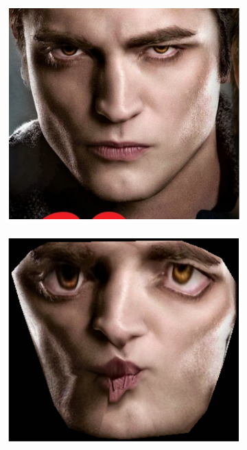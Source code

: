 \begin{figure}[h!]
\begin{subfigure}[b]{0.1\textwidth}
    \end{subfigure}
    \hfill
    \begin{subfigure}[b]{0.12\textwidth}
            \includegraphics[width=\textwidth]{resources/Fig_Draw/test_03_base}
    \end{subfigure}
   	\hfill
    \begin{subfigure}[b]{0.1\textwidth}
            \includegraphics[width=\textwidth]{resources/Fig_Draw/test_03_aam}

\end{subfigure}
\end{figure}
